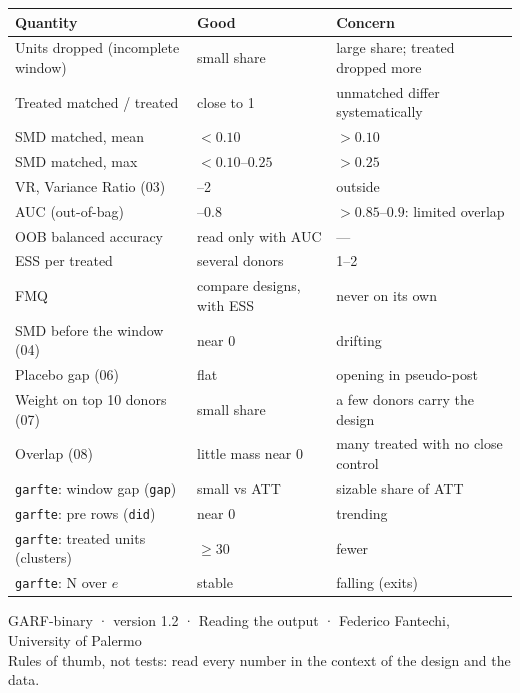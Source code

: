 \documentclass[10pt,a4paper]{article}
\newcommand{\code}[1]{\texttt{#1}}
\newcommand{\good}{\textcolor{good}{\textbf{Good}}}
\newcommand{\bad}{\textcolor{bad}{\textbf{Concern}}}
\begin{document}
\renewcommand{\arraystretch}{1.12}
\begin{tabularx}{\textwidth}{@{}>{\raggedright\arraybackslash}p{}>{\raggedright\arraybackslash}p{}X@{}}
\toprule
Quantity & \good & \bad\\
\midrule
Units dropped (incomplete window) & small share & large share; treated dropped more\\
Treated matched / treated & close to 1 & unmatched differ systematically\\
SMD matched, mean & $<0.10$ & $>0.10$\\
SMD matched, max & $<0.10$--$0.25$ & $>0.25$\\
VR, Variance Ratio (03) & 0.5--2 & outside\\
AUC (out-of-bag) & 0.5--0.8 & $>0.85$--$0.9$: limited overlap\\
OOB balanced accuracy & read only with AUC & ---\\
ESS per treated & several donors & 1--2\\
FMQ & compare designs, with ESS & never on its own\\
SMD before the window (04) & near 0 & drifting\\
Placebo gap (06) & flat & opening in pseudo-post\\
Weight on top 10 donors (07) & small share & a few donors carry the design\\
Overlap (08) & little mass near 0 & many treated with no close control\\
\code{garfte}: window gap (\code{gap}) & small vs ATT & sizable share of ATT\\
\code{garfte}: pre rows (\code{did}) & near 0 & trending\\
\code{garfte}: treated units (clusters) & $\ge 30$ & fewer\\
\code{garfte}: N over $e$ & stable & falling (exits)\\
\bottomrule
\end{tabularx}

\vfill
\begin{center}\small\color{cmt}
GARF-binary · version 1.2 · Reading the output · Federico Fantechi, University of Palermo\\
Rules of thumb, not tests: read every number in the context of the design and the data.
\end{center}
\end{document}
